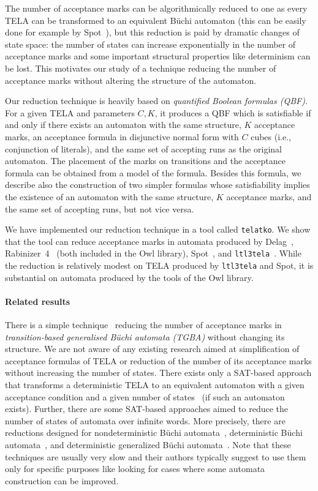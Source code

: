\documentclass[a4paper,UKenglish,cleveref,autoref,thm-restate]{lipics-v2021}
\newcommand{\telatko}{\texttt{telatko}\xspace}
\begin{document}
The number of acceptance marks can be algorithmically reduced to one
as every TELA can be transformed to an equivalent Büchi automaton
(this can be easily done for example by Spot~\cite{duret.16.atva2}),
but this reduction is paid by dramatic changes of state space: the
number of states can increase exponentially in the number of
acceptance marks and some important structural properties like
determinism can be lost. This motivates our study of a technique
reducing the number of acceptance marks without altering the structure
of the automaton.

Our reduction technique is heavily based on \emph{quantified Boolean
  formulas (QBF)}. For a given TELA and parameters $C,K$, it produces
a QBF which is satisfiable if and only if there exists an
automaton with the same structure, $K$ acceptance marks, an acceptance
formula in disjunctive normal form with $C$ cubes (i.e., conjunction
of literals), and the same set of accepting runs as the original
automaton. The placement of the marks on transitions and the
acceptance formula can be obtained from a model of the
formula. Besides this formula, we describe also the construction of
two simpler formulas whose satisfiability implies the existence of an
automaton with the same structure, $K$ acceptance marks, and the same
set of accepting runs, but not vice versa.

We have implemented our reduction technique in a tool called
\telatko. We show that the tool can reduce acceptance marks in
automata produced by Delag~\cite{muller.17.gandalf},
Rabinizer~4~\cite{kretinsky.18.cav} (both included in the Owl
library), Spot~\cite{duret.16.atva2}, and
\texttt{ltl3tela}~\cite{major.19.atva}.  While the reduction is
relatively modest on TELA produced by \texttt{ltl3tela} and Spot, it
is substantial on automata produced by the tools of the Owl library.

\paragraph*{Related results}
There is a simple technique~\cite{babiak.13.spin} reducing the number
of acceptance marks in \emph{transition-based generalised Büchi
  automata (TGBA)} without changing its structure. We are not aware
of any existing research aimed at simplification of acceptance
formulas of TELA or reduction of the number of its acceptance marks
without increasing the number of states. There exists only a SAT-based
approach that transforms a deterministic TELA to an
equivalent automaton with a given acceptance condition and a given
number of states~\cite{baarir.15.lpar} (if such an automaton
exists). Further, there are some SAT-based approaches aimed to reduce
the number of states of automata over infinite words. More precisely,
there are reductions designed for nondeterministic Büchi
automata~\cite{ehlers.10.spin}, deterministic Büchi
automata~\cite{ehlers.10.sat}, and deterministic generalized Büchi
automata~\cite{baarir.14.forte}. Note that these techniques are
usually very slow and their authors typically suggest to use them only
for specific purposes like looking for cases where some automata
construction can be improved.
\end{document}
